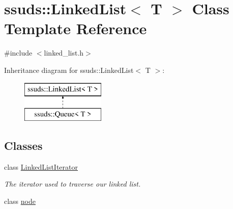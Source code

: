 \hypertarget{classssuds_1_1_linked_list}{}\section{ssuds\+::Linked\+List$<$ T $>$ Class Template Reference}
\label{classssuds_1_1_linked_list}


{\ttfamily \#include $<$linked\+\_\+list.\+h$>$}

Inheritance diagram for ssuds\+::Linked\+List$<$ T $>$\+:\begin{figure}[H]
\begin{center}
\leavevmode
\includegraphics[height=2.000000cm]{classssuds_1_1_linked_list}
\end{center}
\end{figure}
\subsection*{Classes}
\begin{DoxyCompactItemize}
\item 
class \mbox{\hyperlink{classssuds_1_1_linked_list_1_1_linked_list_iterator}{Linked\+List\+Iterator}}
\begin{DoxyCompactList}\small\item\em The iterator used to traverse our linked list. \end{DoxyCompactList}\item 
class \mbox{\hyperlink{classssuds_1_1_linked_list_1_1node}{node}}
\end{DoxyCompactItemize}
